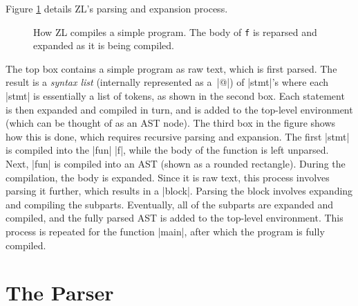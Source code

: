 Figure \ref{fig} details ZL's parsing and expansion process.  
\begin{figure}
\begin{center}
\UndefineShortVerb{\|}
\thefig
\DefineShortVerb{\|}
\end{center}
\caption{How ZL compiles a simple program.  The body of \texttt{f} is
  reparsed and expanded as it is being compiled.}
\label{fig}
\end{figure}
The top box contains a simple program as raw text, which is first parsed.
The result is a \textit{syntax list} (internally represented as a~|@|)
of |stmt|'s where each |stmt| is essentially a list of tokens, as
shown in the second box.  Each statement is then expanded and compiled
in turn, and is added to the top-level environment (which can be
thought of as an AST node). The third box in the figure shows how this
is done, which requires recursive parsing and expansion.  The first
|stmt| is compiled into the |fun| |f|, while the body of the function
is left unparsed.  Next, |fun| is compiled into an AST (shown as a
rounded rectangle).  During the compilation, the body is expanded.
Since it is raw text, this process involves parsing it further, which
results in a |block|.  Parsing the block involves expanding and
compiling the subparts.  Eventually, all of the subparts are
expanded and compiled, and the fully parsed AST is added to the
top-level environment.  This process is repeated for the function
|main|, after which the program is fully compiled.
\section{The Parser}
\label{parser}

